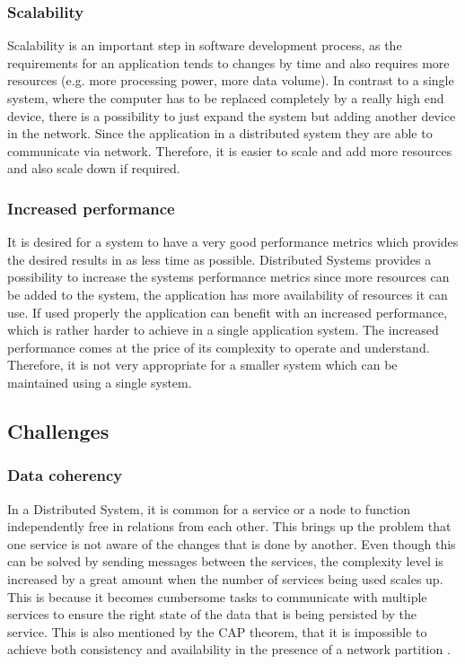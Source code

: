         \subsubsection{Scalability}
        Scalability is an important step in software development process, as the requirements for an application tends to changes by time and also requires more resources
        (e.g. more processing power, more data volume). 
        In contrast to a single system, where the computer 
        has to be replaced completely by a really high end device, there is a possibility to just expand the system but adding another device in the network.
        Since the application in a distributed system they are able to communicate via network. Therefore, it is easier to scale and add more resources and 
        also scale down if required. 

        \subsubsection{Increased performance}
        It is desired for a system to have a very good performance metrics which provides the desired results in as less time as possible.
        Distributed Systems provides a possibility to increase the systems performance metrics since more resources can be added to the system,
        the application has more availability of resources it can use. If used properly the application can benefit with an increased performance, 
        which is rather harder to achieve in a single application system. The increased performance comes at the price of its complexity to operate and understand.
        Therefore, it is not very appropriate for a smaller system which can be maintained using a single system.
    
    \subsection{Challenges}    
        \label{subsection: distriChallenges}
        \subsubsection{Data coherency}
        In a Distributed System, it is common for a service or a node to function independently free in relations from each other. This brings up the problem that
        one service is not aware of the changes that is done by another. Even though this can be solved by sending messages between the services, the complexity
        level is increased by a great amount when the number of services being used scales up. This is because it becomes cumbersome tasks to communicate with
        multiple services to ensure the right state of the data that is being persisted by the service. This is also mentioned by the CAP theorem, that it is
        impossible to achieve both consistency and availability in the presence of a network partition \cite[p.~59]{CAP}.

